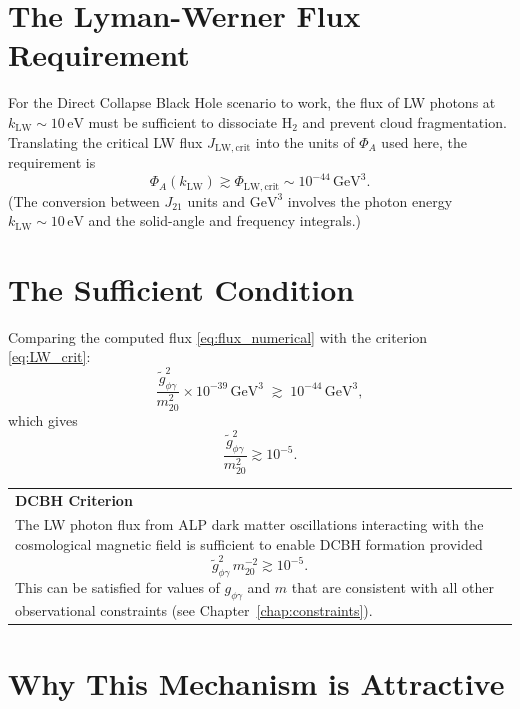 \documentclass[12pt,a4paper]{report}
\newenvironment{keyresult}[1][Key Result]{%
  \par\medskip\noindent
  \begin{tabular}{|p{\dimexpr\linewidth-2\tabcolsep-2\arrayrulewidth\relax}|}
  \hline
  \textbf{#1}\\[2pt]
}{%
  \\ \hline
  \end{tabular}
  \par\medskip
}
\newcommand{\gag}{g_{\phi\gamma}}
\newcommand{\gtag}{\tilde{g}_{\phi\gamma}}
\newcommand{\LW}{\mathrm{LW}}
\theoremstyle{definition}
\begin{document}
\section{The Lyman-Werner Flux Requirement}

For the Direct Collapse Black Hole scenario to work, the flux of LW photons at
$k_{\LW}\sim 10\,\mathrm{eV}$ must be sufficient to dissociate H$_2$ and prevent
cloud fragmentation. Translating the critical LW flux $J_{\LW,\mathrm{crit}}$ into
the units of $\Phi_A$ used here, the requirement is
\begin{equation}
  \Phi_A(k_{\LW}) \gtrsim \Phi_{\LW,\mathrm{crit}}\sim 10^{-44}\,\mathrm{GeV}^3.
  \label{eq:LW_crit}
\end{equation}
(The conversion between $J_{21}$ units and $\mathrm{GeV}^3$ involves the photon
energy $k_{\LW}\sim 10\,\mathrm{eV}$ and the solid-angle and frequency integrals.)

\section{The Sufficient Condition}

Comparing the computed flux \eqref{eq:flux_numerical} with the criterion \eqref{eq:LW_crit}:
\begin{equation}
  \frac{\gtag^2}{m_{20}^2}\times10^{-39}\,\mathrm{GeV}^3
  \;\gtrsim\; 10^{-44}\,\mathrm{GeV}^3,
\end{equation}
which gives
\begin{equation}
  \boxed{\frac{\gtag^2}{m_{20}^2} \gtrsim 10^{-5}.}
  \label{eq:LW_condition}
\end{equation}

\begin{keyresult}[DCBH Criterion]
The LW photon flux from ALP dark matter oscillations interacting with the cosmological
magnetic field is sufficient to enable DCBH formation provided
\begin{equation}
  \tilde{g}_{\phi\gamma}^2\,m_{20}^{-2} \gtrsim 10^{-5}.
\end{equation}
This can be satisfied for values of $\gag$ and $m$ that are consistent with all
other observational constraints (see Chapter~\ref{chap:constraints}).
\end{keyresult}

\section{Why This Mechanism is Attractive}
\end{document}
